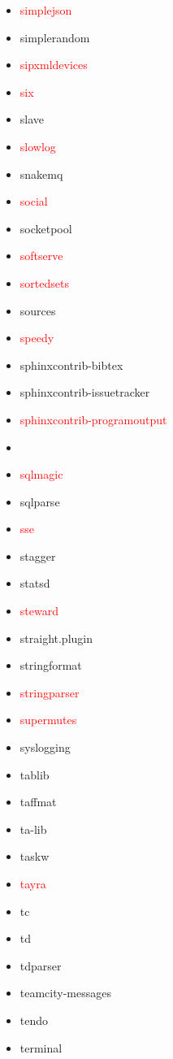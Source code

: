 \documentclass{l4proj}
\begin{document}
\begin{appendices}
{\begin{itemize}
\item\textcolor{red}{simplejson}
\item simplerandom
\item\textcolor{red}{sipxmldevices}
\item\textcolor{red}{six}
\item slave
\item\textcolor{red}{slowlog}
\item snakemq
\item\textcolor{red}{social}
\item socketpool
\item\textcolor{red}{softserve}
\item\textcolor{red}{sortedsets}
\item sources
\item\textcolor{red}{speedy}
\item sphinxcontrib-bibtex
\item sphinxcontrib-issuetracker
\item\textcolor{red}{sphinxcontrib-programoutput}
\item {}
\item\textcolor{red}{sqlmagic}
\item sqlparse
\end{itemize}
}%
\noindent\parbox[t]{0.32\textwidth}{\raggedright%
\begin{itemize}
\item\textcolor{red}{sse}
\item stagger
\item statsd
\item\textcolor{red}{steward}
\item straight.plugin
\item stringformat
\item\textcolor{red}{stringparser}
\item\textcolor{red}{supermutes}
\item syslogging
\item tablib
\item taffmat
\item ta-lib
\item taskw
\item\textcolor{red}{tayra}
\item tc
\item td
\item tdparser
\item teamcity-messages
\item tendo
\item terminal

\end{itemize}}
\end{appendices}
\end{document}
